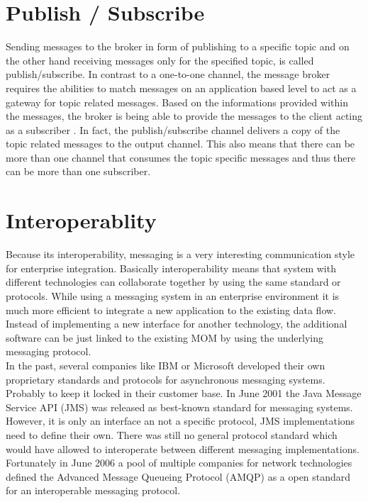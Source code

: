 \section{Publish / Subscribe}
Sending messages to the broker in form of publishing to a specific topic and on
the other hand receiving messages only for the specified topic, is called
publish/subscribe. In contrast to a one-to-one channel, the message broker
requires the abilities to match messages on an application based level to act as
a gateway for topic related messages. Based on the informations provided within
the messages, the broker is being able to provide the messages to the client
acting as a subscriber \cite{TAN06}. In fact, the publish/subscribe channel
delivers a copy of the topic related messages to the output channel. This also
means that there can be more than one channel that consumes the topic specific
messages and thus there can be more than one subscriber. \cite{EIP03}

\section{Interoperablity}
Because its interoperability, messaging is a very interesting communication
style for enterprise integration. Basically interoperability means that system with
different technologies can collaborate together by using the same standard or
protocols. While using a messaging system in an enterprise environment it is
much more efficient to integrate a new application to the existing data flow.
Instead of implementing a new interface for another technology, the additional
software can be just linked to the existing MOM by using the underlying
messaging protocol.\\

In the past, several companies like IBM or Microsoft developed their own
proprietary standards and protocols for asynchronous messaging systems.
Probably to keep it locked in their customer base. In June 2001 the Java Message
Service API (JMS) was released as best-known standard for messaging systems.
However, it is only an interface an not a specific protocol, JMS implementations
need to define their own. There was still no general protocol standard which
would have allowed to interoperate between different messaging implementations.
Fortunately in June 2006 a pool of multiple companies for network technologies
defined the Advanced Message Queueing Protocol (AMQP) as a open standard for an
interoperable messaging protocol. \cite{PrpAMQP}
 
